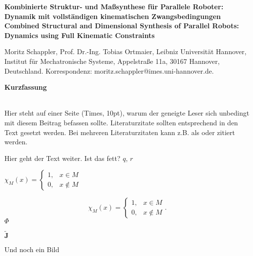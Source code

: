 \documentclass[fleqn,a4paper,10pt]{article}
\newcommand{\bm}[1]{\mathbf{#1}}
\newenvironment{mytitle}{\fontsize{16pt}{1.0} \selectfont \bfseries}{\\}
\newenvironment*{myabstract}{\begin{Large}\bfseries}{\end{Large}\\[6pt]}%
\renewenvironment{figure}
  {\par\vspace{6pt}\noindent\minipage{\linewidth}}
  {\endminipage\par\vspace{6pt}}
\begin{document}
\begin{mytitle} 
Kombinierte Struktur- und Maßsynthese für Parallele Roboter: Dynamik mit vollständigen kinematischen Zwangsbedingungen \\[6pt] %
Combined Structural and Dimensional Synthesis of Parallel Robots: Dynamics using Full Kinematic Constraints
\end{mytitle}

Moritz Schappler, Prof. Dr.-Ing. Tobias Ortmaier, Leibniz Universität Hannover, Institut für Mechatronische Systeme, Appelstraße 11a, 30167 Hannover, Deutschland. Korrespondenz: moritz.schappler@imes.uni-hannover.de.

\vspace{24pt} %

\begin{myabstract} Kurzfassung \end{myabstract}
Hier steht auf einer Seite (Times, 10pt), warum der geneigte Leser sich unbedingt mit diesem Beitrag befassen sollte. Literaturzitate sollten entsprechend \cite{literaturpabst2010} in den Text gesetzt werden. Bei mehreren Literaturzitaten kann z.B. als \cite{literaturpabst2010,mueller2011} oder \cite{literaturpabst2010,meyer2009,mueller2011} zitiert werden.

\begin{figure}
	\centering
    
    \label{fig:overview}
\end{figure}

Hier geht der Text weiter. Ist das fett? $\mathit{{q}}$, $r$

$\chi_M(x)=\left\{\begin{array}{ll} 1, & x\in M \\0, & x\not\in M\end{array}\right.$
    
\begin{equation}
\chi_M(x)=\left\{\begin{array}{ll} 1, & x\in M \\
0, & x\not\in M\end{array}\right. .
\end{equation}
$\bm{\varPhi}$

$\tilde{\bm{J}}$

Und noch ein Bild

\begin{figure}
    \centering
    
    \label{fig:details_kindyn}
\end{figure}
\end{document}
